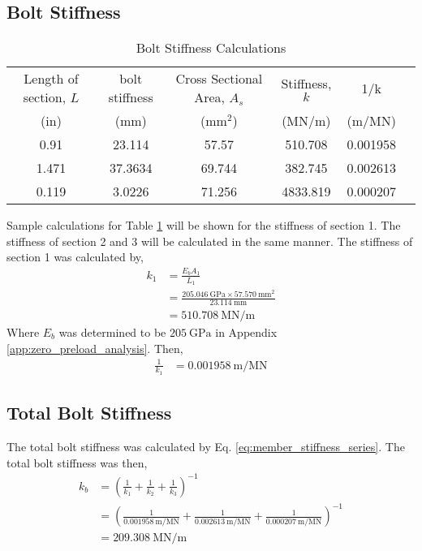 \subsection{Bolt Stiffness}
\begin{table}[h]
    \centering
    \caption{Bolt Stiffness Calculations}
    \label{tab:bolt_stiffness}
    \begin{tabular}{cccccc}
    \toprule
    Length of section, $L$	& bolt stiffness	& Cross Sectional Area, $A_s$	& Stiffness, $k$	& 1/k \\
    (in)	& (mm)	& (mm$^2$)	& (MN/m)	& (m/MN) \\
    \midrule
    0.91	& 23.114	& 57.57 & 510.708 & 0.001958 \\
    1.471	& 37.3634	& 69.744 & 382.745 & 0.002613 \\
    0.119	& 3.0226	& 71.256 & 4833.819 & 0.000207 \\
    \bottomrule
    \end{tabular}
\end{table}
Sample calculations for Table \ref{tab:bolt_stiffness} will be shown for the stiffness of section 1. The stiffness of section 2 and 3 will be calculated in the same manner. The stiffness of section 1 was calculated by,
\begin{align*}
    k_1 &= \frac{E_b A_1}{L_1} \\
    &= \frac{\qty{205.046}{\giga\pascal} \times \qty{57.570}{\milli\meter\squared}}{\qty{23.114}{\milli\meter}} \\
    &= \qty{510.708}{\mega\newton\per\meter}
\end{align*}
Where $E_b$ was determined to be $\qty{205}{\giga\pascal}$ in Appendix \ref{app:zero_preload_analysis}. Then,
\begin{align*}
    \frac{1}{k_1} &= \qty{0.001958}{\meter\per\mega\newton}
\end{align*}

\subsection{Total Bolt Stiffness}
The total bolt stiffness was calculated by Eq. \ref{eq:member_stiffness_series}. The total bolt stiffness was then,
\begin{align*}
    k_b &= \left(\frac{1}{k_1} + \frac{1}{k_2} + \frac{1}{k_3}\right)^{-1} \\
    &= \left(\frac{1}{\qty{0.001958}{\meter\per\mega\newton}} + \frac{1}{\qty{0.002613}{\meter\per\mega\newton}} + \frac{1}{\qty{0.000207}{\meter\per\mega\newton}}\right)^{-1} \\
    &= \boxed{\qty{209.308}{\mega\newton\per\meter}}
\end{align*}

